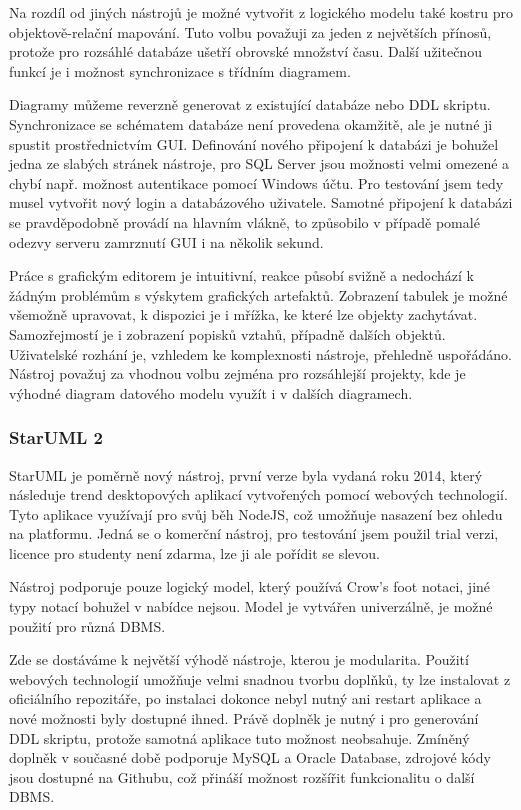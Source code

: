 \documentclass[czech,bachelor,public,dept460,male,oneside]{diploma}
\begin{document}
		Na rozdíl od jiných nástrojů je možné vytvořit z logického modelu také kostru pro objektově-relační mapování. Tuto volbu považuji za jeden z největších přínosů, protože pro rozsáhlé databáze ušetří obrovské množství času. Další užitečnou funkcí je i možnost synchronizace s třídním diagramem.
		
		Diagramy můžeme reverzně generovat z existující databáze nebo DDL skriptu. Synchronizace se schématem databáze není provedena okamžitě, ale je nutné ji spustit prostřednictvím GUI. Definování nového připojení k databázi je bohužel jedna ze slabých stránek nástroje, pro SQL Server jsou možnosti velmi omezené a chybí např. možnost autentikace pomocí Windows účtu. Pro testování jsem tedy musel vytvořit nový login a databázového uživatele. Samotné připojení k databázi se pravděpodobně provádí na hlavním vlákně, to způsobilo v případě pomalé odezvy serveru zamrznutí GUI i na několik sekund.
		
		Práce s grafickým editorem je intuitivní, reakce působí svižně a nedochází k žádným problémům s výskytem grafických artefaktů. Zobrazení tabulek je  možné všemožně upravovat, k dispozici je i mřížka, ke které lze objekty zachytávat. Samozřejmostí je i zobrazení popisků vztahů, případně dalších objektů. Uživatelské rozhání je, vzhledem ke komplexnosti nástroje, přehledně uspořádáno. Nástroj považuj za vhodnou volbu zejména pro rozsáhlejší projekty, kde je výhodné diagram datového modelu využít i v dalších diagramech.
		
		\subsubsection{StarUML 2}
		StarUML je poměrně nový nástroj, první verze byla vydaná roku 2014, který následuje trend desktopových aplikací vytvořených pomocí webových technologií. Tyto aplikace využívají pro svůj běh NodeJS, což umožňuje nasazení bez ohledu na platformu. Jedná se o komerční nástroj, pro testování jsem použil trial verzi, licence pro studenty není zdarma, lze ji ale pořídit se slevou.
		
		Nástroj podporuje pouze logický model, který používá Crow's foot notaci, jiné typy notací bohužel v nabídce nejsou. Model je vytvářen univerzálně, je možné  použití pro různá DBMS. 
		
		Zde se dostáváme k největší výhodě nástroje, kterou je modularita. Použití webových technologií umožňuje velmi snadnou tvorbu doplňků, ty lze instalovat z oficiálního repozitáře, po instalaci dokonce nebyl nutný ani restart aplikace a nové možnosti byly dostupné ihned. Právě doplněk je nutný i pro generování DDL skriptu, protože samotná aplikace tuto možnost neobsahuje. Zmíněný doplněk v současné době podporuje MySQL a Oracle Database, zdrojové kódy jsou dostupné na Githubu, což přináší možnost rozšířit funkcionalitu o další DBMS.
		
\end{document}
